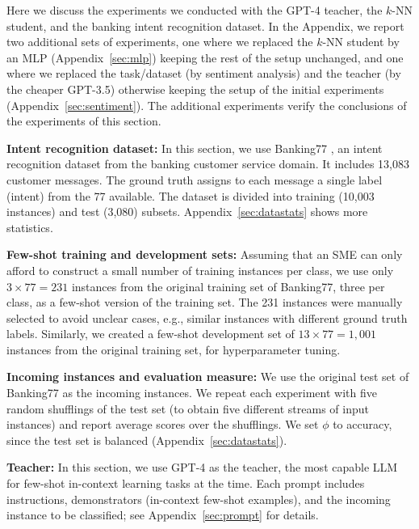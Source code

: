 \documentclass[11pt]{article}
\begin{document}
Here we discuss the experiments we conducted with the GPT-4 teacher, the $k$-NN student, and the banking intent recognition dataset. In the Appendix, we report two additional sets of experiments, one where we replaced the $k$-NN student by an MLP (Appendix~\ref{sec:mlp}) keeping the rest of the setup unchanged, and one where we replaced the task/dataset (by sentiment analysis) and the teacher (by the cheaper GPT-3.5) otherwise keeping the setup of the initial experiments (Appendix~\ref{sec:sentiment}). The additional experiments verify the conclusions of the experiments of this section. 

\vspace{1mm}\noindent\textbf{Intent recognition dataset:} 
In this section, we use Banking77 \cite{banking77}, an intent recognition dataset from the banking customer service domain. It includes 13,083 customer messages. The ground truth assigns to each message a single label (intent) from the 77 available. The dataset is divided into training (10,003 instances) and test (3,080) subsets. Appendix~\ref{sec:datastats} shows more statistics. 


\vspace{1mm}\noindent\textbf{Few-shot training and development sets:} 
Assuming that an SME can only afford to construct a small number of training instances per class, we use only $3\times77=231$ instances from the original training set of Banking77, three per class, as a few-shot version of the training set. The 231 instances were manually selected to avoid unclear cases, e.g., similar instances with different ground truth labels. Similarly, we created a few-shot development set of $13\times77=1,001$ instances from the original training set, for hyperparameter tuning.


\vspace{1mm}\noindent\textbf{Incoming instances and evaluation measure:} We use the original test set of Banking77 as the incoming instances. We repeat each experiment with five random shufflings of the test set (to obtain five different streams of input instances) and report average scores over the shufflings. We set $\phi$ to accuracy, since the test set is balanced (Appendix~\ref{sec:datastats}). 

\vspace{1mm}\noindent\textbf{Teacher:} 
In this section, we use GPT-4 \cite{OpenAI2023GPT4TR} as the teacher, the most capable LLM for few-shot in-context learning tasks at the time. Each prompt includes instructions, demonstrators (in-context few-shot examples), and the incoming instance to be classified; see Appendix~\ref{sec:prompt} for details.
\end{document}
